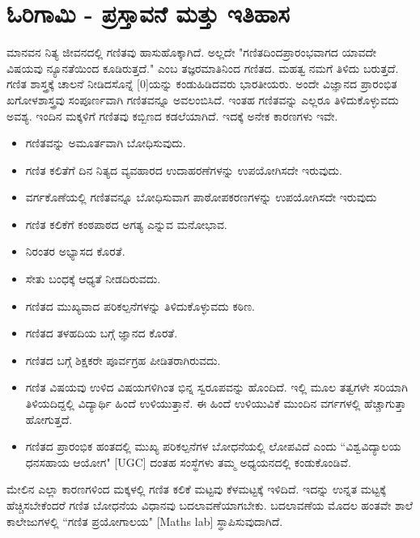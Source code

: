 \section{ಓರಿಗಾಮಿ - ಪ್ರಸ್ತಾವನೆ ಮತ್ತು ಇತಿಹಾಸ }\label{sec1.1}
 
 ಮಾನವನ ನಿತ್ಯ ಜೀವನದಲ್ಲಿ ಗಣಿತವು ಹಾಸುಹೊಕ್ಕಾಗಿದೆ. ಅಲ್ಲದೇ "ಗಣಿತದಿಂದ\break ಪ್ರಾರಂಭವಾಗದ ಯಾವದೇ ವಿಷಯವು ನ್ಯೂನತೆಯಿಂದ ಕೂಡಿರುತ್ತದೆ." ಎಂಬ ತಜ್ಞರ\break ಮಾತಿನಿಂದ ಗಣಿತದ. ಮಹತ್ವ ನಮಗೆ ತಿಳಿದು ಬರುತ್ತದೆ. ಗಣಿತ ಶಾಸ್ತ್ರಕ್ಕೆ  ಚಾಲನೆ ನೀಡಿದ\break ಸೊನ್ನೆ [0]ಯನ್ನು ಕಂಡುಹಿಡಿದವರು ಭಾರತೀಯರು. ಅಂದೇ ವಿಜ್ಞಾನದ ಪ್ರಾರಂಭಿತ ಖಗೋಳಶಾಸ್ತ್ರವು ಸಂಪೂರ್ಣವಾಗಿ ಗಣಿತವನ್ನೂ ಅವಲಂಬಿಸಿದೆ. ಇಂತಹ ಗಣಿತವನ್ನು ಎಲ್ಲರೂ ತಿಳಿದುಕೊಳ್ಳುವದು ಅವಶ್ಯ. ಇಂದಿನ ಮಕ್ಕಳಿಗೆ ಗಣಿತವು ಕಬ್ಬಿಣದ ಕಡಲೆಯಾಗಿದೆ. ಇದಕ್ಕೆ ಅನೇಕ ಕಾರಣಗಳು ಇವೇ. 
  \begin{itemize} 
 \itemsep=2pt
 \item ಗಣಿತವನ್ನು ಅಮೂರ್ತವಾಗಿ ಬೋಧಿಸುವುದು. 
 
 \item ಗಣಿತ ಕಲಿತೆಗೆ ದಿನ ನಿತ್ಯದ ವ್ಯವಹಾರದ ಉದಾಹರಣೆಗಳನ್ನು ಉಪಯೋಗಿಸದೇ ಇರುವುದು.
 
 \item ವರ್ಗಕೊಣೆಯಲ್ಲಿ ಗಣಿತವನ್ನೂ ಬೋಧಿಸುವಾಗ ಪಾಠೋಪಕರಣಗಳನ್ನು ಉಪಯೋಗಿಸದೇ ಇರುವುದು
 
 \item ಗಣಿತ ಕಲಿಕೆಗೆ ಕಂಠಪಾಠದ ಅಗತ್ಯ ಎನ್ನುವ ಮನೋಭಾವ.

\item ನಿರಂತರ ಅಭ್ಯಾಸದ ಕೊರತೆ.
 
 \item  ಸೇತು ಬಂಧಕ್ಕೆ ಆಧ್ಯತೆ ನೀಡದಿರುವದು.
 
 \item ಗಣಿತದ ಮುಖ್ಯವಾದ ಪರಿಕಲ್ಪನೆಗಳನ್ನು ತಿಳಿದುಕೊಳ್ಳುವದು ಕಠಿಣ.
 
 \item ಗಣಿತದ ತಳಹದಿಯ ಬಗ್ಗೆ ಜ್ಞಾನದ ಕೊರತೆ. 
 
 \item ಗಣಿತದ ಬಗ್ಗೆ ಶಿಕ್ಷಕರೇ ಪೂರ್ವಗ್ರಹ ಪೀಡಿತರಾಗಿರುವದು.
 
 \item ಗಣಿತ ವಿಷಯವು ಉಳಿದ ವಿಷಯಗಳಿಗಿಂತ ಭಿನ್ನ ಸ್ವರೂಪವನ್ನು ಹೊಂದಿದೆ. ಇಲ್ಲಿ ಮೂಲ ತತ್ವಗಳೇ ಸರಿಯಾಗಿ ತಿಳಿಯದಿದ್ದಲ್ಲಿ ವಿದ್ಯಾರ್ಥಿ ಹಿಂದೆ ಉಳಿಯುತ್ತಾನೆ. ಈ ಹಿಂದೆ ಉಳಿಯುವಿಕೆ ಮುಂದಿನ ವರ್ಗಗಳಲ್ಲಿ ಹೆಚ್ಚಾಗುತ್ತಾ ಹೋಗುತ್ತದೆ. 
  
 \item ಗಣಿತದ ಪ್ರಾರಂಭಿಕ ಹಂತದಲ್ಲಿ ಮುಖ್ಯ ಪರಿಕಲ್ಪನೆಗಳ ಬೋಧನೆಯಲ್ಲಿ ಲೋಪವಿದೆ ಎಂದು ``ವಿಶ್ವವಿದ್ಯಾಲಯ ಧನಸಹಾಯ ಆಯೋಗ" [UGC] ದಂತಹ ಸಂಸ್ಥೆಗಳು ತಮ್ಮ ಅಧ್ಯಯನದಲ್ಲಿ ಕಂಡುಕೊಂಡಿವೆ. 
 \end{itemize}
 
 ಮೇಲಿನ ಎಲ್ಲಾ ಕಾರಣಗಳಿಂದ ಮಕ್ಕಳಲ್ಲಿ ಗಣಿತ ಕಲಿಕೆ ಮಟ್ಟವು ಕೆಳಮಟ್ಟಕ್ಕೆ  ಇಳಿದಿದೆ. ಇದನ್ನು ಉನ್ನತ ಮಟ್ಟಕ್ಕೆ ಹೆಚ್ಚಿಸಬೇಕೆಂದರೆ ಗಣಿತ ಬೋಧನೆಯ ವಿಧಾನವು ಬದಲಾವಣೆಯಾಗಬೇಕು. ಬದಲಾವಣೆಯ ಮೊದಲ ಹಂತವೇ ಶಾಲೆ ಕಾಲೇಜುಗಳಲ್ಲಿ ``ಗಣಿತ ಪ್ರಯೋಗಾಲಯ" [Maths lab] ಸ್ಥಾಪಿಸುವುದಾಗಿದೆ.
  
